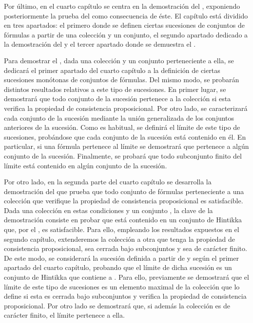\begin{isabellebody}
\begin{isamarkuptext}
  Por último, en el cuarto capítulo se centra en la demostración del , exponiendo posteriormente la prueba del  como consecuencia de éste. El capítulo está dividido en tres apartados: 
  el primero donde se definen ciertas sucesiones de conjuntos de fórmulas a partir de 
  una colección y un conjunto, el segundo apartado dedicado a la demostración del 
   y el tercer apartado donde se demuestra el 
  . 

  Para demostrar el , dada una colección
  y un conjunto perteneciente a ella, se dedicará el primer apartado del cuarto capítulo 
  a la definición de ciertas sucesiones monótonas de conjuntos de fórmulas. Del mismo
  modo, se probarán distintos resultados relativos a este tipo de sucesiones. En primer 
  lugar, se demostrará que todo conjunto de la sucesión pertenece a la colección si esta 
  verifica la propiedad de consistencia proposicional. Por otro lado, se caracterizará 
  cada conjunto de la sucesión mediante la unión generalizada de los conjuntos anteriores 
  de la sucesión. Como es habitual, se definirá el límite de este tipo de sucesiones, 
  probándose que cada conjunto de la sucesión está contenido en él. En particular, si una 
  fórmula pertenece al límite se demostrará que pertenece a algún conjunto de la sucesión. 
  Finalmente, se probará que todo subconjunto finito del límite está contenido en algún 
  conjunto de la sucesión.

  Por otro lado, en la segunda parte del cuarto capítulo se desarrolla la demostración del
   que prueba que todo conjunto de fórmulas
  perteneciente a una colección que verifique la propiedad de consistencia proposicional 
  es satisfacible. Dada una colección  en estas condiciones y un conjunto , 
  la clave de la demostración consiste en probar que  está contenido en un conjunto de 
  Hintikka que, por el , es satisfacible. Para ello, empleando los 
  resultados expuestos en el segundo capítulo, extenderemos la colección  a otra  
  que tenga la propiedad de consistencia proposicional, sea cerrada bajo subconjuntos y 
  sea de carácter finito. De este modo, se considerará la sucesión definida a partir de 
   y  según el primer apartado del cuarto capítulo, probando que el límite de dicha 
  sucesión es un conjunto de Hintikka que contiene a . Para ello, previamente se 
  demostrará que el límite de este tipo de sucesiones es un elemento maximal de la
  colección que lo define si esta es cerrada bajo subconjuntos y verifica la propiedad de
  consistencia proposicional. Por otro lado se demostrará que, si además la colección es 
  de carácter finito, el límite pertenece a ella.


\end{isamarkuptext}
\end{isabellebody}
